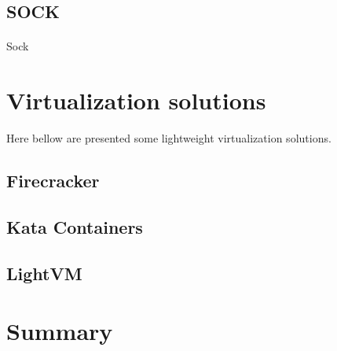 \subsection{SOCK} 
\paragraph{}Sock\cite{oakes2018sock}

\section{Virtualization solutions}

Here bellow are presented some lightweight virtualization solutions.

\subsection{Firecracker}
\subsection{Kata Containers}
\subsection{LightVM} \cite{manco2017my}

\section{Summary}
